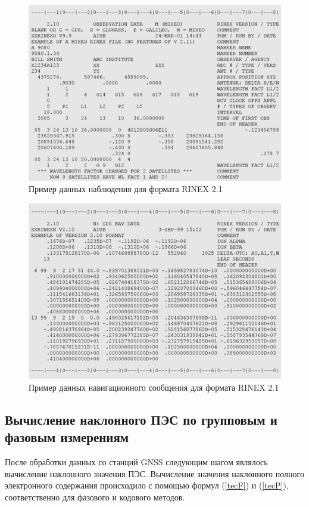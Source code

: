 \documentclass[a4paper]{article}
\begin{document}
\begin{figure}[h!]
\centering
\includegraphics[width = 1\linewidth]{pics/rinex_obs.png}
\caption{Пример данных наблюдения для формата RINEX 2.1}
\end{figure}

\begin{figure}[h!]
\centering
\includegraphics[width = 1\linewidth]{pics/rinex_nav.png}
\caption{Пример данных навигационного сообщения для формата RINEX 2.1}
\end{figure}


\clearpage
\newpage

\subsection{Вычисление наклонного ПЭС по групповым и фазовым измерениям}
После обработки данных со станций GNSS следующим шагом являлось вычисление наклонного значения ПЭС. Вычисление значения наклонного полного электронного содержания происходило с помощью формул (\ref{tecF}) и (\ref{tecP}), соответственно для фазового и кодового методов. 
\end{document}
